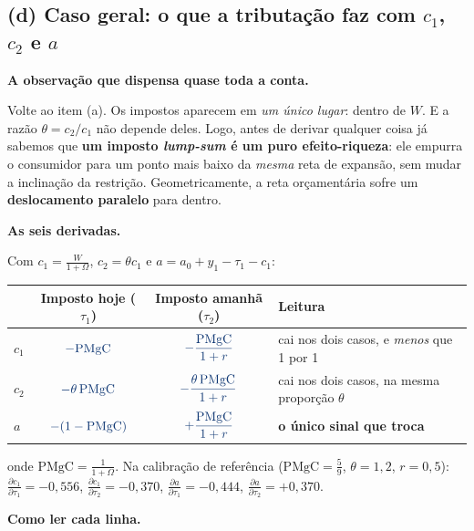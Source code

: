 \documentclass[11pt, a4paper]{article}
\newcommand{\passo}[1]{\medskip\noindent\textbf{#1}\par\nobreak}
\newcommand{\resp}[1]{%
  \ifmmode {\color{darkblue}#1}\else\textcolor{darkblue}{\textbf{#1}}\fi}
\begin{document}
\subsection*{(d) Caso geral: o que a tributação faz com $c_1$, $c_2$ e $a$}

\passo{A observação que dispensa quase toda a conta.}
Volte ao item (a). Os impostos aparecem em \emph{um único lugar}: dentro de $W$. E a razão
$\theta=c_2/c_1$ não depende deles. Logo, antes de derivar qualquer coisa já sabemos que
\textbf{um imposto \emph{lump-sum} é um puro efeito-riqueza}: ele empurra o consumidor para
um ponto mais baixo da \emph{mesma} reta de expansão, sem mudar a inclinação da restrição.
Geometricamente, a reta orçamentária sofre um \textbf{deslocamento paralelo} para dentro.

\passo{As seis derivadas.}
Com $c_1=\frac{W}{1+\Omega}$, $c_2=\theta c_1$ e $a=a_0+y_1-\tau_1-c_1$:

\begin{center}
\small
\renewcommand{\arraystretch}{1.6}
\begin{tabular}{@{}lccl@{}}
\toprule
& \textbf{Imposto hoje} ($\tau_1$) & \textbf{Imposto amanhã} ($\tau_2$) & \textbf{Leitura} \\
\midrule
$c_1$ & $\resp{-\mathrm{PMgC}}$ & $\resp{-\dfrac{\mathrm{PMgC}}{1+r}}$
  & cai nos dois casos, e \emph{menos} que 1 por 1 \\
$c_2$ & $\resp{-\theta\,\mathrm{PMgC}}$ & $\resp{-\dfrac{\theta\,\mathrm{PMgC}}{1+r}}$
  & cai nos dois casos, na mesma proporção $\theta$ \\
$a$   & $\resp{-(1-\mathrm{PMgC})}$ & $\resp{+\dfrac{\mathrm{PMgC}}{1+r}}$
  & \textbf{o único sinal que troca} \\
\bottomrule
\end{tabular}
\end{center}

\noindent onde $\mathrm{PMgC}=\frac{1}{1+\Omega}$. Na calibração de referência
($\mathrm{PMgC}=\frac59$, $\theta=1{,}2$, $r=0{,}5$): $\frac{\partial c_1}{\partial\tau_1}
=-0{,}556$, $\frac{\partial c_1}{\partial\tau_2}=-0{,}370$,
$\frac{\partial a}{\partial\tau_1}=-0{,}444$, $\frac{\partial a}{\partial\tau_2}=+0{,}370$.

\passo{Como ler cada linha.}
\end{document}
